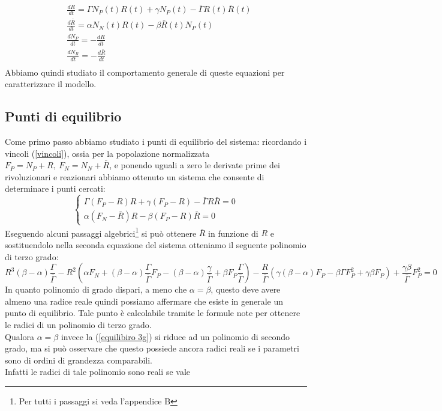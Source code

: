 \begin{equation} \label{eq:1.4}
		\begin{aligned}
			&\frac{dR}{dt}=\Gamma N_P(t) R(t)+\gamma N_P(t)-\bar{\Gamma}R(t)\bar{R}(t)\\
		&\frac{d\bar{R}}{dt}=\alpha N_N(t)R(t)-\beta \bar{R}(t)N_P(t)\\
		&\frac{dN_{P}}{dt}= -\frac{dR}{dt}\\
		&\frac{dN_{R}}{dt}= -\frac{d\bar{R}}{dt}\\
		\end{aligned}
\end{equation}
Abbiamo quindi studiato il comportamento generale di queste equazioni per caratterizzare il modello.
\subsection{Punti di equilibrio}
Come primo passo abbiamo studiato i punti di equilibrio del sistema: ricordando i vincoli (\ref{vincoli}), ossia per la popolazione normalizzata $
	F_{P}=N_{P}+R ,\ F_{N}=N_{N}+\bar{R}
$, e ponendo uguali a zero le derivate prime dei rivoluzionari e reazionari abbiamo ottenuto un sistema che consente di determinare i punti cercati:
\begin{equation}
	\begin{cases}
		\Gamma (F_{P}-R)R+\gamma (F_{P}-R)-\bar{\Gamma}R\bar{R}=0\\
		\alpha (F_{N}-\bar{R})R-\beta (F_{P}-R)\bar{R}=0
	\end{cases}
\end{equation}
Eseguendo alcuni passaggi algebrici\footnote{Per tutti i passaggi si veda l'appendice B} si può ottenere $ \bar{R} $ in funzione di $ R $ e sostituendolo nella seconda equazione del sistema otteniamo il seguente polinomio di terzo grado:
\begin{equation}
	R^{3}(\beta - \alpha)\frac{\Gamma}{\bar{\Gamma}}-R^{2}\left(\alpha F_{N}+(\beta - \alpha)\frac{\Gamma}{\bar{\Gamma}}F_{P}-(\beta - \alpha)\frac{\gamma}{\bar{\Gamma}}+\beta F_{P}\frac{\Gamma}{\bar{\Gamma}}\right)-\frac{R}{\bar{\Gamma}}\left(\gamma (\beta - \alpha)F_{P}-\beta \Gamma F^{2}_{P}+\gamma\beta F_{P}\right)+\frac{\gamma\beta}{\bar{\Gamma}}F^{2}_{P}=0
	\label{equilibiro 3g}
\end{equation}
In quanto polinomio di grado dispari, a meno che $\alpha=\beta$, questo deve avere almeno una radice reale quindi possiamo affermare che esiste in generale un punto di equilibrio. Tale punto è calcolabile tramite le formule note per ottenere le radici di un polinomio di terzo grado.\\Qualora $\alpha=\beta$ invece la (\ref{equilibiro 3g}) si riduce ad un polinomio di secondo grado, ma si può osservare che questo possiede ancora radici reali se i parametri sono di ordini di grandezza comparabili. \\Infatti le radici di tale polinomio sono reali se vale
